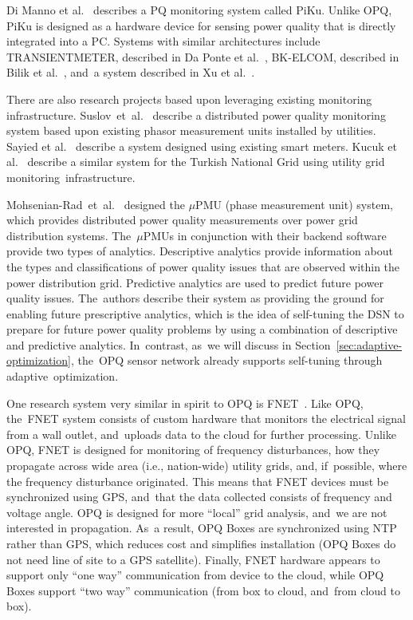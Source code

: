 \documentclass[energies,article,accept,moreauthors,pdftex]{Definitions/mdpi}
\begin{document}
Di Manno et al.~\cite{di_manno_user_2015} describes a PQ monitoring system called PiKu. Unlike OPQ, PiKu is designed as a hardware device for sensing power quality that is directly integrated into a PC. Systems with similar architectures include TRANSIENTMETER, described in Da Ponte et al.~\cite{daponte_transientmeter:_2000}, BK-ELCOM, described in Bilik et al.~\cite{bilik_modular_2007}, and~a system described in Xu et al.~\cite{xu_distributed_2012}.

There are also research projects based upon leveraging existing monitoring infrastructure. \mbox{Suslov et al.~\cite{suslov_distributed_2014}} describe a distributed power quality monitoring system based upon existing phasor measurement units installed by utilities. Sayied et al.~\cite{sayied_power_2013} describe a system designed using existing smart meters. Kucuk et al.~\cite{kucuk_extensible_2010} describe a similar system for the Turkish National Grid using utility grid monitoring~infrastructure.

Mohsenian-Rad~et~al.~\cite{mohsenian-rad_distribution_2018} designed the $\mu$PMU (phase measurement unit) system, which provides distributed power quality measurements over power grid distribution systems. The~$\mu$PMUs in conjunction with their backend software provide two types of analytics. Descriptive analytics provide information about the types and classifications of power quality issues that are observed within the power distribution grid. Predictive analytics are used to predict future power quality issues. The~authors describe their system as providing the ground for enabling future prescriptive analytics, which is the idea of self-tuning the DSN to prepare for future power quality problems by using a combination of descriptive and predictive analytics. In~contrast, as~we will discuss in Section~\ref{sec:adaptive-optimization}, the~OPQ sensor network already supports self-tuning through adaptive~optimization.

One research system very similar in spirit to OPQ is FNET~\cite{liu_distribution_2017}. Like OPQ, the~FNET system consists of custom hardware that monitors the electrical signal from a wall outlet, and~uploads data to the cloud for further processing. Unlike OPQ, FNET is designed for monitoring of frequency disturbances, how they propagate across wide area (i.e., nation-wide) utility grids, and, if~possible, where the frequency disturbance originated. This means that FNET devices must be synchronized using GPS, and~that the data collected consists of frequency and voltage angle. OPQ is designed for more “local” grid analysis, and~we are not interested in propagation. As~a result, OPQ Boxes are synchronized using NTP rather than GPS, which reduces cost and simplifies installation (OPQ Boxes do not need line of site to a GPS satellite). Finally, FNET hardware appears to support only “one way” communication from device to the cloud, while OPQ Boxes support ``two way'' communication (from box to cloud, and~from cloud to box).
\end{document}
